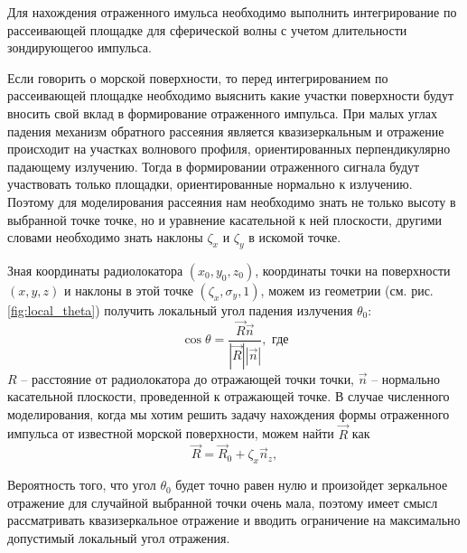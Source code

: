 Для нахождения отраженного имульса необходимо выполнить интегрирование по
рассеивающей площадке для сферической волны с учетом длительности зондирующегоо
импульса.



Если говорить о морской поверхности, то перед интегрированием по рассеивающей
площадке необходимо выяснить какие участки поверхности будут вносить свой вклад
в формирование отраженного импульса.  При малых углах падения механизм обратного  рассеяния является квазизеркальным и отражение происходит на участках волнового профиля, ориентированных
перпендикулярно падающему излучению. Тогда в формировании отраженного сигнала
будут участвовать только площадки, ориентированные нормально к излучению. 
Поэтому для моделирования рассеяния нам необходимо знать не только высоту
в выбранной точке точке, но и уравнение касательной к ней плоскости, другими словами необходимо знать наклоны $\zeta_x$ и  $\zeta_y$ в искомой точке.


Зная координаты радиолокатора  $(x_0,y_0,z_0)$, координаты точки на
поверхности $(x,y,z)$ и наклоны в этой точке $(\zeta_x,\sigma_y,1)$, можем из
геометрии (см. рис. \ref{fig:local_theta}) получить локальный угол падения
излучения $\theta_0$:
\begin{equation}
    \label{eq:local_theta}
    \cos \theta =  \frac{\vec R \vec n}{|\vec R| |\vec n|}, \text{ где}
\end{equation}
$R$ -- расстояние от радиолокатора до отражающей точки точки,
 $\vec n$ -- нормально касательной плоскости, проведенной к отражающей точке.
 В случае численного моделирования, когда мы хотим решить задачу нахождения
 формы отраженного импульса от известной морской поверхности, можем найти
 $\vec R$ как
 \begin{equation}
     \label{eq:R_1}
     \vec R = \vec R_0 + \zeta_x \vec n_z,
 \end{equation}




Вероятность того, что угол $\theta_0$ будет точно равен нулю и произойдет
зеркальное отражение для случайной выбранной точки очень мала, поэтому имеет
смысл рассматривать квазизеркальное отражение и вводить ограничение на
максимально допустимый локальный угол отражения. 

